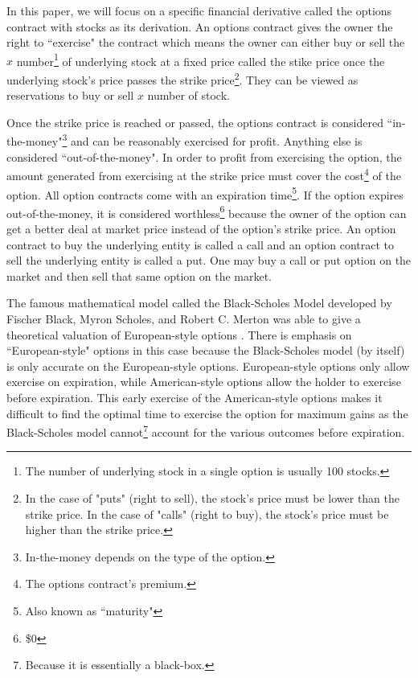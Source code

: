 \documentclass[12pt, letterpaper]{article}\usepackage{float}
\begin{document}
\medskip

In this paper, we will focus on a specific financial derivative called the options contract with stocks as its derivation.
An options contract gives the owner the right to ``exercise" the contract which means the owner can either buy or sell the ${x}$ number\footnote{The number of underlying stock in a single option is usually 100 stocks.} of underlying stock at a fixed price called the stike price once the underlying stock's price passes the strike price\footnote{In the case of "puts" (right to sell), the stock's price must be lower than the strike price. In the case of "calls" (right to buy), the stock's price must be higher than the strike price.\label{option rules}}.
They can be viewed as reservations to buy or sell ${x}$ number of stock.

\medskip

Once the strike price is reached or passed, the options contract is considered ``in-the-money"\footnote{In-the-money depends on the type of the option.} and can be reasonably exercised for profit.
Anything else is considered ``out-of-the-money".
In order to profit from exercising the option, the amount generated from exercising at the strike price must cover the cost\footnote{The options contract's premium.} of the option.
All option contracts come with an expiration time\footnote{Also known as ``maturity"}.
If the option expires out-of-the-money, it is considered worthless\footnote{\$0} because the owner of the option can get a better deal at market price instead of the option's strike price.
An option contract to buy the underlying entity is called a call and an option contract to sell the underlying entity is called a put.
One may buy a call or put option on the market and then sell that same option on the market.

\medskip

The famous mathematical model called the Black-Scholes Model developed by Fischer Black, Myron Scholes, and Robert C. Merton was able to give a theoretical valuation of European-style options \cite{blackscholesmodelwikipedia}.
There is emphasis on ``European-style" options in this case because the Black-Scholes model (by itself) is only accurate on the European-style options.
European-style options only allow exercise on expiration, while American-style options allow the holder to exercise before expiration.
This early exercise of the American-style options makes it difficult to find the optimal time to exercise the option for maximum gains \cite{blackscholesmodelwikipedia} as the Black-Scholes model cannot\footnote{Because it is essentially a black-box.} account for the various outcomes before expiration. 
\end{document}
